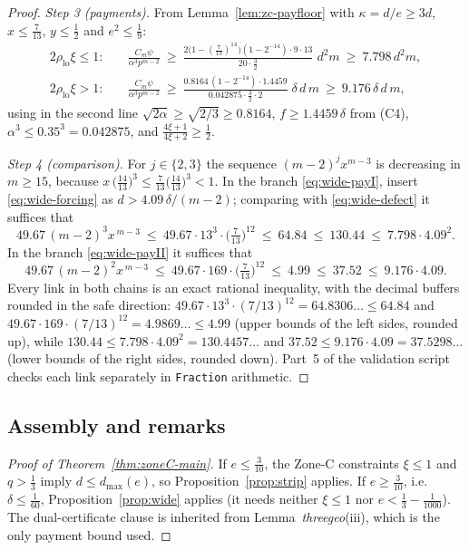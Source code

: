 \documentclass[11pt]{article}
\theoremstyle{remark}
\theoremstyle{plain}
\theoremstyle{plain}
\begin{document}
\begin{proof}
\emph{Step 3 (payments).}  From Lemma~\ref{lem:zc-payfloor} with
$\kappa=d/e\ge3d$, $x\le\tfrac7{13}$, $y\le\tfrac12$ and $e^2\le\tfrac19$:
\begin{align}
 2\rho_{\mathrm{lo}}\xi\le1:\quad
 &\frac{C_m\psi}{\alpha^3p^{m-2}}\ \ge\
 \frac{2\bigl(1-(\tfrac7{13})^{14}\bigr)(1-2^{-14})\cdot9\cdot13}
      {20\cdot\tfrac32}\;d^2m\ \ge\ 7.798\,d^2m,
 \label{eq:wide-payI}\\
 2\rho_{\mathrm{lo}}\xi>1:\quad
 &\frac{C_m\psi}{\alpha^3p^{m-2}}\ \ge\
 \frac{0.8164\,(1-2^{-14})\cdot1.4459}
      {0.042875\cdot\tfrac32\cdot2}\;\delta\,d\,m\ \ge\ 9.176\,\delta\,d\,m,
 \label{eq:wide-payII}
\end{align}
using in the second line $\sqrt{2\alpha}\ge\sqrt{2/3}\ge0.8164$,
$f\ge1.4459\,\delta$ from (C4), $\alpha^3\le0.35^3=0.042875$, and
$\tfrac{4\xi+1}{4\xi+2}\ge\tfrac12$.

\emph{Step 4 (comparison).}  For $j\in\{2,3\}$ the sequence
$(m-2)^jx^{m-3}$ is decreasing in $m\ge15$, because
$x\,\bigl(\tfrac{14}{13}\bigr)^3\le\tfrac7{13}\bigl(\tfrac{14}{13}\bigr)^3
<1$.  In the branch \eqref{eq:wide-payI}, insert
\eqref{eq:wide-forcing} as $d>4.09\,\delta/(m-2)$; comparing with
\eqref{eq:wide-defect} it suffices that
\[
 49.67\,(m-2)^3x^{\,m-3}\ \le\ 49.67\cdot13^3\cdot
 \bigl(\tfrac7{13}\bigr)^{12}\ \le\ 64.84\ \le\ 130.44\ \le\
 7.798\cdot4.09^2 .
\]
In the branch \eqref{eq:wide-payII} it suffices that
\[
 49.67\,(m-2)^2x^{\,m-3}\ \le\ 49.67\cdot169\cdot
 \bigl(\tfrac7{13}\bigr)^{12}\ \le\ 4.99\ \le\ 37.52\ \le\
 9.176\cdot4.09 .
\]
Every link in both chains is an exact rational inequality, with the
decimal buffers rounded in the safe direction:
$49.67\cdot13^3\cdot(7/13)^{12}=64.8306\ldots\le64.84$ and
$49.67\cdot169\cdot(7/13)^{12}=4.9869\ldots\le4.99$ (upper bounds of the
left sides, rounded up), while $130.44\le7.798\cdot4.09^2=130.4457\ldots$
and $37.52\le9.176\cdot4.09=37.5298\ldots$ (lower bounds of the right
sides, rounded down).  Part~5 of the validation script checks each link
separately in \texttt{Fraction} arithmetic.
\end{proof}

\subsection{Assembly and remarks}\label{sec:zoneC-assembly}

\begin{proof}[Proof of Theorem~\ref{thm:zoneC-main}]
If $e\le\tfrac3{10}$, the Zone-C constraints $\xi\le1$ and $q>\tfrac13$
imply $d\le d_{\max}(e)$, so Proposition~\ref{prop:strip} applies.  If
$e\ge\tfrac3{10}$, i.e.\ $\delta\le\tfrac1{60}$,
Proposition~\ref{prop:wide} applies (it needs neither $\xi\le1$ nor
$e<\tfrac13-\tfrac1{1000}$).  The dual-certificate clause is inherited from
Lemma~\emph{threegeo}(iii), which is the only payment bound used.
\end{proof}
\end{document}

